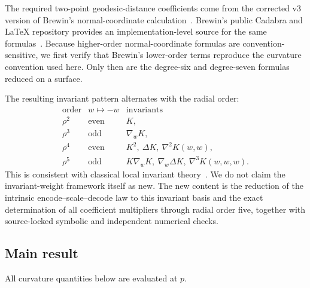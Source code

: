 \documentclass[11pt]{amsart}
\numberwithin{equation}{section}
\theoremstyle{remark}
\begin{document}
The required two-point geodesic-distance coefficients come from the corrected v3 version of Brewin's normal-coordinate calculation~\cite{Brewin2009}.  Brewin's public Cadabra and LaTeX repository provides an implementation-level source for the same formulas~\cite{BrewinRepository}.  Because higher-order normal-coordinate formulas are convention-sensitive, we first verify that Brewin's lower-order terms reproduce the curvature convention used here.  Only then are the degree-six and degree-seven formulas reduced on a surface.

The resulting invariant pattern alternates with the radial order:
\[
\begin{array}{c|c|l}
\text{order} & w\mapsto-w & \text{invariants}\\
\hline
\rho^2 & \text{even} & K,\\
\rho^3 & \text{odd} & \nabla_wK,\\
\rho^4 & \text{even} & K^2,\ \Delta K,\ \nabla^2K(w,w),\\
\rho^5 & \text{odd} & K\nabla_wK,\ \nabla_w\Delta K,\ \nabla^3K(w,w,w).
\end{array}
\]
This is consistent with classical local invariant theory~\cite{Gilkey,GrahamKuo2026}.  We do not claim the invariant-weight framework itself as new.  The new content is the reduction of the intrinsic encode--scale--decode law to this invariant basis and the exact determination of all coefficient multipliers through radial order five, together with source-locked symbolic and independent numerical checks.

\subsection*{Main result}
All curvature quantities below are evaluated at $p$.
\end{document}
